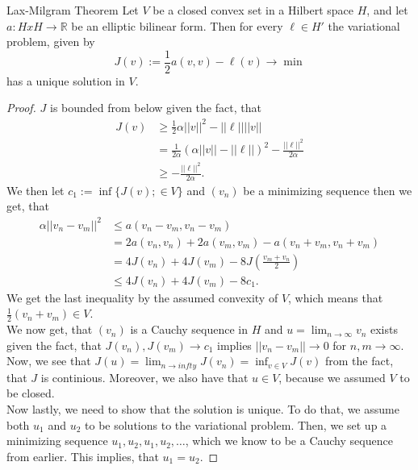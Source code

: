 \begin{thmx}{Lax-Milgram Theorem}
Let $V$ be a closed convex set in a Hilbert space $H$, and let $a:H x H \rightarrow \mathbb{R}$ be an elliptic bilinear form. Then for every $\ell\in H'$ the variational problem, given by
\[
    J(v):=\frac{1}{2} a(v,v) - \ell(v) \longrightarrow \min    
\]
has a unique solution in $V$.
\end{thmx}

\begin{proof}
    $J$ is bounded from below given the fact, that
    \begin{align*}
        J(v) &\geq \frac{1}{2} \alpha ||v||^2 - ||\ell|| ||v||\\
        &= \frac{1}{2\alpha} {(\alpha ||v||-||\ell||)}^2 - \frac{||\ell||^2}{2\alpha} \\
        &\geq - \frac{||\ell||^2}{2\alpha}.
    \end{align*}
    We then let $c_1 := \inf\{J(v); \in V\}$ and $(v_n)$ be a minimizing sequence then we get, that 
    \begin{align*}
        \alpha ||v_n-v_m||^2 &\leq a(v_n-v_m,v_n-v_m) \\
        &= 2a(v_n,v_n) + 2a(v_m,v_m) - a (v_n+v_m,v_n+v_m) \\
        &= 4J(v_n) + 4J(v_m) - 8J(\frac{v_m+v_n}{2}) \\
        &\leq 4J(v_n) + 4J(v_m) - 8c_1. 
    \end{align*}
    We get the last inequality by the assumed convexity of $V$, which means that $\frac{1}{2}(v_n + v_m) \in V$. 
    \\
    We now get, that $(v_n)$ is a Cauchy sequence in $H$ and $u = \lim_{n\rightarrow \infty}v_n$ exists given the fact, that $J(v_n),J(v_m)\rightarrow c_1$ implies $||v_n - v_m|| \rightarrow 0$ for $n,m\rightarrow \infty$.  
    \\
    Now, we see that $J(u) = \lim_{n\rightarrow infty} J(v_n) = \inf_{v\in V} J(v)$ from the fact, that $J$ is continious. Moreover, we also have that $u\in V$, because we assumed $V$ to be closed. 
    \\
    Now lastly, we need to show that the solution is unique. To do that, we assume both $u_1$ and $u_2$ to be solutions to the variational problem. 
    Then, we set up a minimizing sequence $u_1,u_2,u_1,u_2,\ldots$, which we know to be a Cauchy sequence from earlier. This implies, that $u_1 = u_2$.
\end{proof}